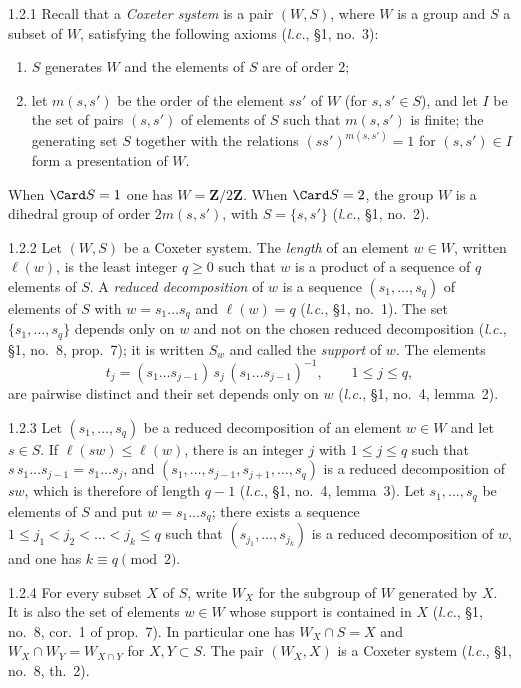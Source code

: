 \documentclass[12pt,a4paper,oneside,english]{smfart}
\makeatletter
\newcommand{\btanchor}[1]{\leavevmode\Hy@raisedlink{\hypertarget{bt:#1}{}}}
\theoremstyle{definition}
\theoremstyle{bt}
\makeatother
\begin{document}
\num{1.2.1}\btanchor{1.2.1} Recall that a \emph{Coxeter system} is a pair $(W,S)$, where $W$
is a group and $S$ a subset of $W$, satisfying the following axioms (\emph{l.c.}, \S1, no.~3):
\begin{enumerate}[label=(\roman*),leftmargin=2.4em]
\item $S$ generates $W$ and the elements of $S$ are of order $2$;
\item let $m(s,s')$ be the order of the element $ss'$ of $W$ (for
  $s,s'\in S$), and let $I$ be the set of pairs $(s,s')$ of elements of $S$   such that $m(s,s')$ is finite; the generating set $S$ together with the   relations $(ss')^{m(s,s')}=1$ for $(s,s')\in I$ form a presentation of $W$.
\end{enumerate}
When $\Card S=1$ one has $W=\mathbf{Z}/2\mathbf{Z}$. When $\Card S=2$, the group $W$ is a dihedral group of order $2m(s,s')$, with $S=\{s,s'\}$ (\emph{l.c.}, \S1, no.~2).

\num{1.2.2}\btanchor{1.2.2} Let $(W,S)$ be a Coxeter system. The \emph{length} of an element
$w\in W$, written $\ell(w)$, is the least integer $q\geqslant0$ such that $w$ is a product of a sequence of $q$ elements of $S$. A \emph{reduced decomposition} of $w$ is a sequence $(s_1,\dots,s_q)$ of elements of $S$ with $w=s_1\dots s_q$ and $\ell(w)=q$ (\emph{l.c.}, \S1, no.~1). The set $\{s_1,\dots,s_q\}$ depends only on $w$ and not on the chosen reduced decomposition (\emph{l.c.}, \S1, no.~8, prop.~7); it is written $S_w$ and called the \emph{support} of $w$. The elements
\[
  t_j=(s_1\dots s_{j-1})\,s_j\,(s_1\dots s_{j-1})^{-1},
  \qquad 1\leqslant j\leqslant q,
\]
are pairwise distinct and their set depends only on $w$ (\emph{l.c.}, \S1, no.~4, lemma~2).

\num{1.2.3}\btanchor{1.2.3} Let $(s_1,\dots,s_q)$ be a reduced decomposition of an element
$w\in W$ and let $s\in S$. If $\ell(sw)\leqslant\ell(w)$, there is an integer $j$ with $1\leqslant j\leqslant q$ such that $s\,s_1\dots s_{j-1}=s_1\dots s_j$, and $(s_1,\dots,s_{j-1},s_{j+1},\dots,s_q)$ is a reduced decomposition of $sw$, which is therefore of length $q-1$ (\emph{l.c.}, \S1, no.~4, lemma~3). Let $s_1,\dots,s_q$ be elements of $S$ and put $w=s_1\dots s_q$; there exists a sequence $1\leqslant j_1<j_2<\dots<j_k\leqslant q$ such that $(s_{j_1},\dots,s_{j_k})$ is a reduced decomposition of $w$, and one has $k\equiv q\pmod 2$.

\num{1.2.4}\btanchor{1.2.4} For every subset $X$ of $S$, write $W_X$ for the subgroup of $W$
generated by $X$. It is also the set of elements $w\in W$ whose support is contained in $X$ (\emph{l.c.}, \S1, no.~8, cor.~1 of prop.~7). In particular one has $W_X\cap S=X$ and $W_X\cap W_Y=W_{X\cap Y}$ for $X,Y\subset S$. The pair $(W_X,X)$ is a Coxeter system (\emph{l.c.}, \S1, no.~8, th.~2).
\end{document}
